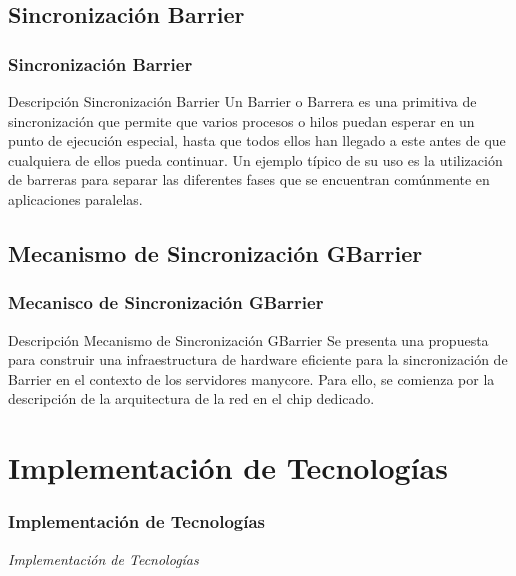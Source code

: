 \documentclass[11pt]{beamer}					%
\begin{document}
		\subsection{Sincronización Barrier}			
		 \begin{frame}[fragile]						%
			\frametitle{Sincronización Barrier}
			
			\begin{block}{Descripción Sincronización Barrier}
Un Barrier o Barrera es una primitiva de sincronización que
permite que varios procesos o hilos puedan esperar en un punto
de ejecución especial, hasta que todos ellos han llegado a este
antes de que cualquiera de ellos pueda continuar. Un ejemplo
típico de su uso es la utilización de barreras para separar las
diferentes fases que se encuentran comúnmente en aplicaciones
paralelas.			

\end{block}
		\end{frame}
		
				\subsection{Mecanismo de Sincronización GBarrier}			
		 \begin{frame}[fragile]						%
			\frametitle{Mecanisco de Sincronización GBarrier}
			
			\begin{block}{Descripción Mecanismo de Sincronización GBarrier}
Se presenta una propuesta para construir una infraestructura
de hardware eficiente para la sincronización de Barrier en el
contexto de los servidores manycore. Para ello, se comienza
por la descripción de la arquitectura de la red en el chip
dedicado.		

\end{block}
		\end{frame}
		
	\section{Implementación de Tecnologías}	
		 \begin{frame}[fragile]
			\frametitle{Implementación de Tecnologías}
			\begin{huge}
			\begin{center}
				\emph{\textit{Implementación de Tecnologías}}
			\end{center}
			\end{huge}
		\end{frame}		
\end{document}

